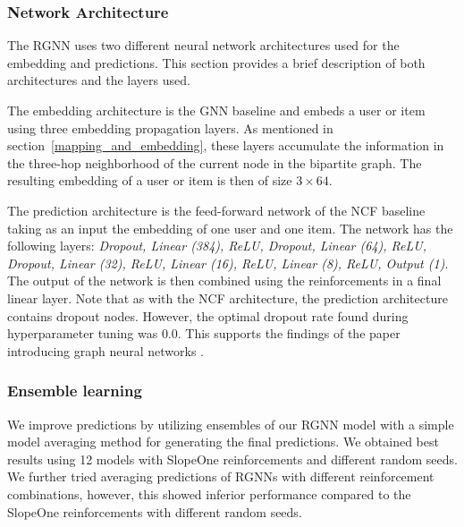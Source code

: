 \subsubsection{Network Architecture} The RGNN uses two different neural network architectures used for the embedding and predictions. This section provides a brief description of both architectures and the layers used.

The embedding architecture is the GNN baseline and embeds a user or item using three embedding propagation layers. As mentioned in section~\ref{mapping_and_embedding}, these layers accumulate the information in the three-hop neighborhood of the current node in the bipartite graph. The resulting embedding of a user or item is then of size $3 \times 64$.

The prediction architecture is the feed-forward network of the NCF baseline taking as an input the embedding of one user and one item. The network has the following layers: \emph{Dropout, Linear (384), ReLU, Dropout, Linear (64), ReLU, Dropout, Linear (32), ReLU, Linear (16), ReLU, Linear (8), ReLU, Output (1)}. The output of the network is then combined using the reinforcements in a final linear layer. Note that as with the NCF architecture, the prediction architecture contains dropout nodes. However, the optimal dropout rate found during hyperparameter tuning was $0.0$. This supports the findings of the paper introducing graph neural networks \citep{wang2019neural}.

\subsubsection{Ensemble learning}
We improve predictions by utilizing ensembles of our RGNN model with a simple model averaging method for generating the final predictions. We obtained best results using 12 models with SlopeOne reinforcements and different random seeds. We further tried averaging predictions of RGNNs with different reinforcement combinations, however, this showed inferior performance compared to the SlopeOne reinforcements with different random seeds.